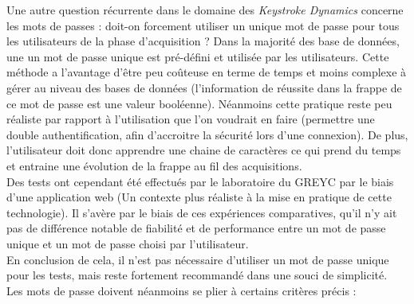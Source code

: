 Une autre question récurrente dans le domaine des \textit{Keystroke Dynamics} concerne les mots de passes : doit-on forcement utiliser un unique mot de passe pour tous les utilisateurs de la phase d'acquisition ? Dans la majorité des base de données, une un mot de passe unique est pré-défini et utilisée par les utilisateurs. Cette méthode a l'avantage d'être peu coûteuse en terme de temps et moins complexe à gérer au niveau des bases de données (l'information de réussite dans la frappe de ce mot de passe est une valeur booléenne). Néanmoins cette pratique reste peu réaliste par rapport à l'utilisation que l'on voudrait en faire (permettre une double authentification, afin d'accroitre la sécurité lors d'une connexion). De plus, l'utilisateur doit donc apprendre une chaine de caractères ce qui prend du temps et entraine une évolution de la frappe au fil des acquisitions.\\

Des tests ont cependant été effectués par le laboratoire du GREYC\cite{giotWeb} par le biais d'une application web (Un contexte plus réaliste à la mise en pratique de cette technologie). Il s'avère par le biais de ces expériences comparatives, qu'il n'y ait pas de différence notable de fiabilité et de performance entre un mot de passe unique et un mot de passe choisi par l'utilisateur.\\

En conclusion de cela, il n'est pas nécessaire d'utiliser un mot de passe unique pour les tests, mais reste fortement recommandé dans une souci de simplicité.\\

Les mots de passe doivent néanmoins se plier à certains critères précis :\\

